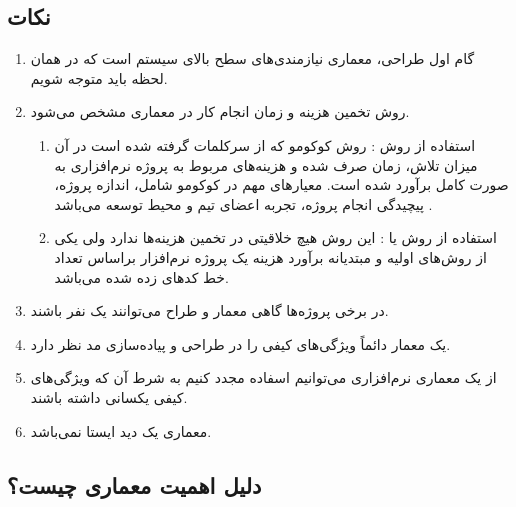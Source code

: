 \documentclass[a4paper]{article}
\begin{document}
\subsection*{نکات}

\begin{enumerate}
    \item گام اول طراحی، معماری نیازمندی‌های سطح بالای سیستم است که در همان لحظه
    باید متوجه شویم.
    \item روش تخمین هزینه و زمان انجام کار در معماری مشخص می‌شود.
    \begin{enumerate}
        \item استفاده از روش : روش کوکومو که از سرکلمات
         گرفته شده است در آن میزان تلاش، زمان صرف
        شده و هزینه‌های مربوط به پروژه نرم‌افزاری به صورت کامل برآورد شده است.
        معیار‌های مهم در کوکومو شامل، اندازه پروژه، پیچیدگی انجام پروژه، تجربه
        اعضای تیم و محیط توسعه می‌باشد \cite{COCOMO}.
        \item استفاده از روش  یا : این روش هیچ خلاقیتی
        در تخمین هزینه‌ها ندارد ولی یکی از روش‌های اولیه و مبتدیانه برآورد هزینه
        یک پروژه نرم‌افزار براساس تعداد خط کد‌های زده شده می‌باشد.
    \end{enumerate}
    \item در برخی پروژه‌ها گاهی معمار و طراح می‌توانند یک نفر باشند.
    \item یک معمار دائماً ویژگی‌های کیفی را در طراحی و پیاده‌سازی مد نظر دارد.
    \item از یک معماری نرم‌افزاری می‌توانیم اسفاده مجدد کنیم به شرط آن که
    ویژگی‌های کیفی یکسانی داشته باشند.
    \item معماری یک دید ایستا نمی‌باشد.
\end{enumerate}

\subsection{دلیل اهمیت معماری چیست؟}
\end{document}
